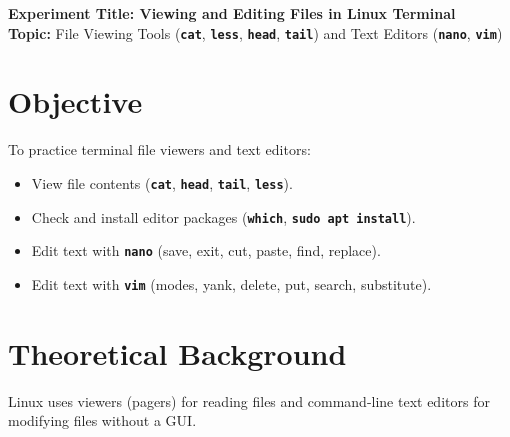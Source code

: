 \documentclass[10pt,a4paper]{article}
\newcommand{\cmd}[1]{\texttt{\textbf{#1}}}
\begin{document}
\thispagestyle{firstpage}

\begin{center}
  {\Large\bfseries\sffamily\color{primary} Experiment Title: Viewing and Editing Files in Linux Terminal}\\[3pt]
  {\normalsize\sffamily\textbf{Topic:} File Viewing Tools (\cmd{cat}, \cmd{less}, \cmd{head}, \cmd{tail}) and Text Editors (\cmd{nano}, \cmd{vim})}
\end{center}
\vspace{-4pt}

\section{Objective}
To practice terminal file viewers and text editors:
\begin{itemize}[noitemsep,topsep=1pt,leftmargin=1.2em]
  \item View file contents (\cmd{cat}, \cmd{head}, \cmd{tail}, \cmd{less}).
  \item Check and install editor packages (\cmd{which}, \cmd{sudo apt install}).
  \item Edit text with \cmd{nano} (save, exit, cut, paste, find, replace).
  \item Edit text with \cmd{vim} (modes, yank, delete, put, search, substitute).
\end{itemize}

\section{Theoretical Background}
Linux uses viewers (pagers) for reading files and command-line text editors for modifying files without a GUI.
\end{document}
